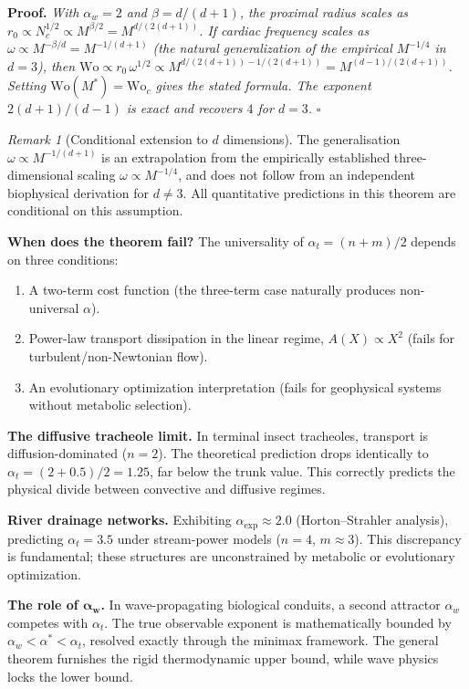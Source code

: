 \documentclass[11pt,a4paper]{article}
\theoremstyle{remark}
\newtheorem{remark}{Remark}
\begin{document}
\noindent\textbf{Proof.} \textit{With $\alpha_w=2$ and $\beta = d/(d+1)$, the proximal radius scales as $r_0 \propto N_c^{1/2} \propto M^{\beta/2} = M^{d/(2(d+1))}$. If cardiac frequency scales as $\omega \propto M^{-\beta/d} = M^{-1/(d+1)}$ (the natural generalization of the empirical $M^{-1/4}$ in $d=3$), then $\mathrm{Wo} \propto r_0\,\omega^{1/2} \propto M^{d/(2(d+1)) - 1/(2(d+1))} = M^{(d-1)/(2(d+1))}$. Setting $\mathrm{Wo}(M^*) = \mathrm{Wo}_c$ gives the stated formula. The exponent $2(d+1)/(d-1)$ is exact and recovers $4$ for $d=3$.} $\square$

\begin{remark}[Conditional extension to $d$ dimensions]
The generalisation $\omega \propto M^{-1/(d+1)}$ is an extrapolation from the
empirically established three-dimensional scaling $\omega \propto M^{-1/4}$,
and does not follow from an independent biophysical derivation for $d \neq 3$.
All quantitative predictions in this theorem are conditional on this assumption.
\end{remark}

\textbf{When does the theorem fail?}
The universality of $\alpha_t = (n+m)/2$ depends on three conditions:
\begin{enumerate}
    \item A two-term cost function (the three-term case naturally produces non-universal $\alpha$).
    \item Power-law transport dissipation in the linear regime, $A(X) \propto X^2$ (fails for turbulent/non-Newtonian flow).
    \item An evolutionary optimization interpretation (fails for geophysical systems without metabolic selection).
\end{enumerate}

\noindent \textbf{The diffusive tracheole limit.} In terminal insect tracheoles, transport is diffusion-dominated ($n=2$). The theoretical prediction drops identically to $\alpha_t = (2+0.5)/2 = 1.25$, far below the trunk value. This correctly predicts the physical divide between convective and diffusive regimes.

\noindent \textbf{River drainage networks.} Exhibiting $\alpha_{\exp} \approx 2.0$ (Horton--Strahler analysis), predicting $\alpha_t = 3.5$ under stream-power models ($n=4$, $m\approx3$). This discrepancy is fundamental; these structures are unconstrained by metabolic or evolutionary optimization.

\noindent \textbf{The role of $\boldsymbol{\alpha_w}$.} In wave-propagating biological conduits, a second attractor $\alpha_w$ competes with $\alpha_t$. The true observable exponent is mathematically bounded by $\alpha_w < \alpha^* < \alpha_t$, resolved exactly through the minimax framework. The general theorem furnishes the rigid thermodynamic upper bound, while wave physics locks the lower bound.
\end{document}
